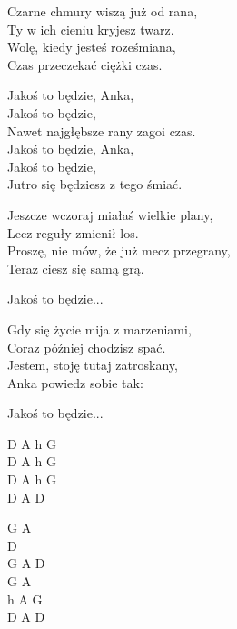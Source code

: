 \begin{text}
    Czarne chmury wiszą już od rana,\\
    Ty w ich cieniu kryjesz twarz.\\
    Wolę, kiedy jesteś roześmiana,\\
    Czas przeczekać ciężki czas.	

    \vin Jakoś to będzie, Anka,\\
    \vin Jakoś to będzie,\\
    \vin Nawet najgłębsze rany zagoi czas.	\\
    \vin Jakoś to będzie, Anka,	\\
    \vin Jakoś to będzie,\\
    \vin Jutro się będziesz z tego śmiać.	

    Jeszcze wczoraj miałaś wielkie plany,\\
    Lecz reguły zmienił los.\\
    Proszę, nie mów, że już mecz przegrany,\\
    Teraz ciesz się samą grą.

    \vin Jakoś to będzie...

    Gdy się życie mija z marzeniami,\\
    Coraz później chodzisz spać.\\
    Jestem, stoję tutaj zatroskany,\\
    Anka powiedz sobie tak:

    \vin Jakoś to będzie...


\end{text}
\begin{chord}
    D A h G\\ 
    D A h G\\
    D A h G\\
    D A D 

    G A \\
    D \\
    G A D\\
    G A \\
    h A G\\
    D A D 

\end{chord}